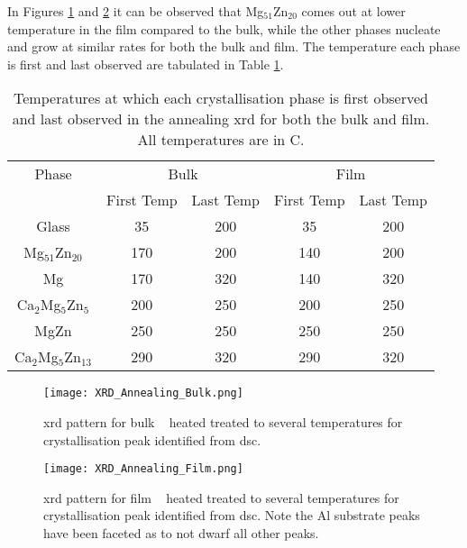 \documentclass[a4paper,12pt,oneside]{article}%
\begin{document}
In Figures \ref{fig:XRD_Annealing_Bulk} and \ref{fig:XRD_Annealing_Film} it can be observed that Mg$_{51}$Zn$_{20}$ comes out at lower temperature in the film compared to the bulk, while the other phases nucleate and grow at similar rates for both the bulk and film. The temperature each phase is first and last observed are tabulated in Table \ref{tab:Crystal_Sequence}. 

\begin{table}[h]
	\centering
	\caption{Temperatures at which each crystallisation phase is first observed and last observed in the annealing \acrshort{xrd} for both the bulk and film. All temperatures are in \degree C.}
	\begin{tabular}{ c c c c c }
		\toprule
		Phase & \multicolumn{2}{c}{Bulk} & \multicolumn{2}{c}{Film}                 \\
		& First Temp & Last Temp & First Temp & Last Temp \\
		\midrule
		Glass 						& 35 & 200 & 35 & 200 \\
		Mg$_{51}$Zn$_{20}$ \cite{Zhang2013, Khan1989} & 170 & 200 & 140 & 200 \\
		Mg 							& 170 & 320 & 140 & 320 \\
		Ca$_{2}$Mg$_{5}$Zn$_{5}$ \cite{Zhang2013, Cao2016} & 200 & 250 & 200 & 250 \\
		MgZn \cite{Khan1989} & 250 & 250 & 250 & 250 \\
		Ca$_{2}$Mg$_{5}$Zn$_{13}$ \cite{Zhang2013, Zhang2012, Zhang2011} & 290 & 320 & 290 & 320 \\
		\bottomrule
	\end{tabular}
	\label{tab:Crystal_Sequence}
\end{table}

\begin{figure}[b]
	\centering
	\texttt{[image: XRD\_Annealing\_Bulk.png]}
	\caption[Table of contents Capition]{\acrshort{xrd} pattern for bulk \MgZnCa~ heated treated to several temperatures for crystallisation peak identified from \acrshort{dsc}.}
	\label{fig:XRD_Annealing_Bulk}
\end{figure}

\begin{figure}[b]
	\centering
	\texttt{[image: XRD\_Annealing\_Film.png]}
	\caption[Table of contents Capition]{\acrshort{xrd} pattern for film \MgZnCa~ heated treated to several temperatures for crystallisation peak identified from \acrshort{dsc}. Note the Al substrate peaks have been faceted as to not dwarf all other peaks.}
	\label{fig:XRD_Annealing_Film}
\end{figure}
\end{document}
